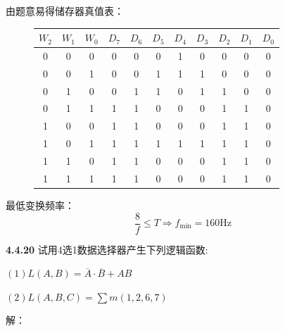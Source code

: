 \documentclass[a4paper,11pt,UTF8]{article}
\begin{document}
由题意易得储存器真值表：
\begin{figure}[H]
	\centering
	\begin{tabular}{ccc|cccccccc}
		\hline
		$W_2$ & $W_1$ & $W_0$ & $D_7$ & $D_6$ & $D_5$ & $D_4$ & $D_3$ & $D_2$ & $D_1$ & $D_0$\\
		\hline
		0 & 0 & 0 & 0 & 0 & 0 & 1 & 0 & 0 & 0 & 0\\
		0 & 0 & 1 & 0 & 0 & 1 & 1 & 1 & 0 & 0 & 0\\
		0 & 1 & 0 & 0 & 1 & 1 & 0 & 1 & 1 & 0 & 0\\
		0 & 1 & 1 & 1 & 1 & 0 & 0 & 0 & 1 & 1 & 0\\
		1 & 0 & 0 & 1 & 1 & 0 & 0 & 0 & 1 & 1 & 0\\
		1 & 0 & 1 & 1 & 1 & 1 & 1 & 1 & 1 & 1 & 0\\
		1 & 1 & 0 & 1 & 1 & 0 & 0 & 0 & 1 & 1 & 0\\
		1 & 1 & 1 & 1 & 1 & 0 & 0 & 0 & 1 & 1 & 0\\
		\hline
	\end{tabular}
\end{figure}
最低变换频率：
$$
	\frac8{f}\leq T\Rightarrow f_{\min}=160\mathrm{Hz}
$$

\textbf{4.4.20} 试用4选1数据选择器产生下列逻辑函数:

$(1)L(A,B)=\overline{A}\cdot\overline{B}+AB$

$(2)L(A,B,C)=\sum m(1,2,6,7)$

解：
\end{document}
